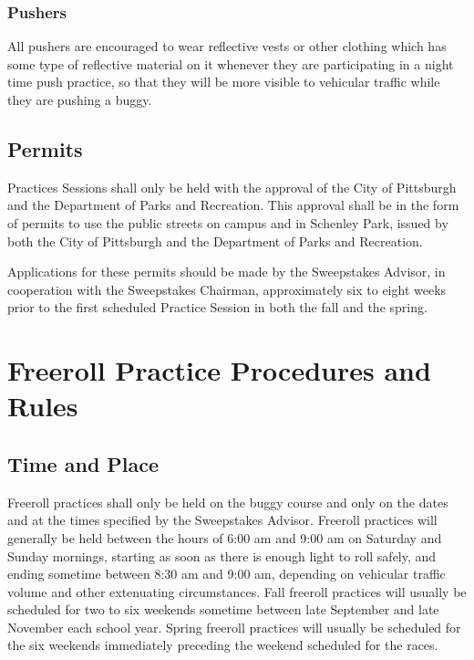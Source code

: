 \subsubsection{Pushers}

	All pushers are encouraged to wear reflective vests or other clothing which has
	some type of reflective material on it whenever they are participating in a
	night time push practice, so that they will be more visible to vehicular
	traffic while they are pushing a buggy.

\subsection{Permits}

	Practices Sessions shall only be held with the approval of the City of
	Pittsburgh and the Department of Parks and Recreation. This approval shall be
	in the form of permits to use the public streets on campus and in Schenley
	Park, issued by
	both the City of Pittsburgh and the Department of Parks and Recreation.

	Applications for these permits should be made by the Sweepstakes Advisor, in
	cooperation with the Sweepstakes Chairman, approximately six to eight weeks
	prior to the first scheduled Practice Session in both the fall and the spring.

\section{Freeroll Practice Procedures and Rules}

\subsection{Time and Place}

	Freeroll practices shall only be held on the buggy course and only on the dates
	and at the times specified by the Sweepstakes Advisor. Freeroll practices will
	generally be held between the hours of 6:00 am and 9:00 am on Saturday and
	Sunday mornings, starting as soon as there is enough light to roll safely, and
	ending sometime between 8:30 am and 9:00 am, depending on vehicular traffic
	volume and other extenuating circumstances. Fall freeroll practices will
	usually be scheduled for two to six weekends sometime between late September
	and late November each school year. Spring freeroll practices will usually be
	scheduled for the six weekends immediately preceding the weekend scheduled for
	the races.

